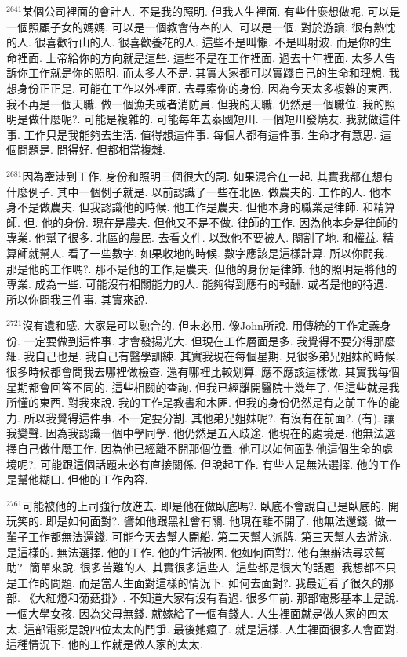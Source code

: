 \documentclass{book}
\begin{document}
$^{2641}$某個公司裡面的會計人.
不是我的照明.
但我人生裡面.
有些什麼想做呢.
可以是一個照顧子女的媽媽.
可以是一個教會侍奉的人.
可以是一個.
對於游讀.
很有熱忱的人.
很喜歡行山的人.
很喜歡養花的人.
這些不是叫懶.
不是叫射波.
而是你的生命裡面.
上帝給你的方向就是這些.
這些不是在工作裡面.
過去十年裡面.
太多人告訴你工作就是你的照明.
而太多人不是.
其實大家都可以實踐自己的生命和理想.
我想身份正正是.
可能在工作以外裡面.
去尋索你的身份.
因為今天太多複雜的東西.
我不再是一個天職.
做一個漁夫或者消防員.
但我的天職.
仍然是一個職位.
我的照明是做什麼呢?.
可能是複雜的.
可能每年去泰國短川.
一個短川發燒友.
我就做這件事.
工作只是我能夠去生活.
值得想這件事.
每個人都有這件事.
生命才有意思.
這個問題是.
問得好.
但都相當複雜.

$^{2681}$因為牽涉到工作.
身份和照明三個很大的詞.
如果混合在一起.
其實我都在想有什麼例子.
其中一個例子就是.
以前認識了一些在北區.
做農夫的.
工作的人.
他本身不是做農夫.
但我認識他的時候.
他工作是農夫.
但他本身的職業是律師.
和精算師.
但.
他的身份.
現在是農夫.
但他又不是不做.
律師的工作.
因為他本身是律師的專業.
他幫了很多.
北區的農民.
去看文件.
以致他不要被人.
閹割了地.
和權益.
精算師就幫人.
看了一些數字.
如果收地的時候.
數字應該是這樣計算.
所以你問我.
那是他的工作嗎?.
那不是他的工作,是農夫.
但他的身份是律師.
他的照明是將他的專業.
成為一些.
可能沒有相關能力的人.
能夠得到應有的報酬.
或者是他的待遇.
所以你問我三件事.
其實來說.

$^{2721}$沒有遺和感.
大家是可以融合的.
但未必用.
像John所說.
用傳統的工作定義身份.
一定要做到這件事.
才會發揚光大.
但現在工作層面是多.
我覺得不要分得那麼細.
我自己也是.
我自己有醫學訓練.
其實我現在每個星期.
見很多弟兄姐妹的時候.
很多時候都會問我去哪裡做檢查.
還有哪裡比較划算.
應不應該這樣做.
其實我每個星期都會回答不同的.
這些相關的查詢.
但我已經離開醫院十幾年了.
但這些就是我所懂的東西.
對我來說.
我的工作是教書和木匪.
但我的身份仍然是有之前工作的能力.
所以我覺得這件事.
不一定要分割.
其他弟兄姐妹呢?.
有沒有在前面?.
(有).
讓我變聲.
因為我認識一個中學同學.
他仍然是五入歧途.
他現在的處境是.
他無法選擇自己做什麼工作.
因為他已經離不開那個位置.
他可以如何面對他這個生命的處境呢?.
可能跟這個話題未必有直接關係.
但說起工作.
有些人是無法選擇.
他的工作是幫他糊口.
但他的工作內容.

$^{2761}$可能被他的上司強行放進去.
即是他在做臥底嗎?.
臥底不會說自己是臥底的.
開玩笑的.
即是如何面對?.
譬如他跟黑社會有關.
他現在離不開了.
他無法還錢.
做一輩子工作都無法還錢.
可能今天去幫人開船.
第二天幫人派牌.
第三天幫人去游泳.
是這樣的.
無法選擇.
他的工作.
他的生活被困.
他如何面對?.
他有無辦法尋求幫助?.
簡單來說.
很多苦難的人.
其實很多這些人.
這些都是很大的話題.
我想都不只是工作的問題.
而是當人生面對這樣的情況下.
如何去面對?.
我最近看了很久的那部.
《大紅燈和菊菇掛》.
不知道大家有沒有看過.
很多年前.
那部電影基本上是說.
一個大學女孩.
因為父母無錢.
就嫁給了一個有錢人.
人生裡面就是做人家的四太太.
這部電影是說四位太太的鬥爭.
最後她瘋了.
就是這樣.
人生裡面很多人會面對.
這種情況下.
他的工作就是做人家的太太.
\end{document}
